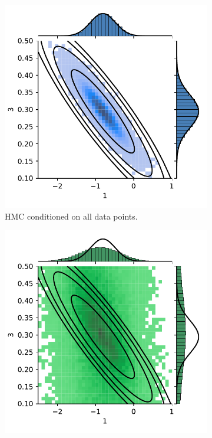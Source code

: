 \begin{figure}[htbp]
    \centering
    \begin{subfigure}[b]{0.4\textwidth}
        \centering
        \includegraphics[width=\textwidth]{Figures/simulated_joint_HMC_15.pdf} 
        \caption{HMC conditioned on all data points.}
    \end{subfigure}
    \begin{subfigure}[b]{0.4\textwidth}
        \centering
        \includegraphics[width=\textwidth]{Figures/simulated_joint_HMC_5.pdf} 

\end{subfigure}
\end{figure}
